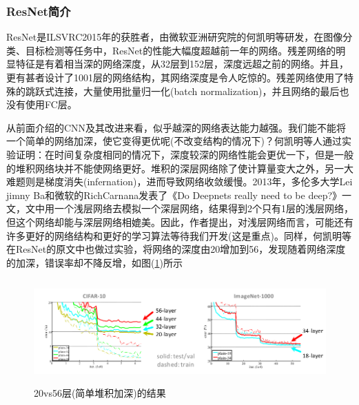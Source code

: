         \subsubsection{ResNet简介}
            \par
            ResNet\cite{2015.HeKaiming}是ILSVRC2015年的获胜者，由微软亚洲研究院的何凯明等研发，在图像分类、目标检测等任务中，ResNet的性能大幅度超越前一年的网络。残差网络的明显特征是有着相当深的网络深度，从32层到152层，深度远超之前的网络。并且，更有甚者设计了1001层的网络结构，其网络深度是令人吃惊的。残差网络使用了特殊的跳跃式连接，大量使用批量归一化(batch normalization)，并且网络的最后也没有使用FC层。
            \par
            从前面介绍的CNN及其改进来看，似乎越深的网络表达能力越强。我们能不能将一个简单的网络加深，使它变得更优呢(不改变结构的情况下)？何凯明等人通过实验证明：在时间复杂度相同的情况下，深度较深的网络性能会更优一下，但是一般的堆积网络块并不能使网络更好。堆积的深层网络除了使计算量变大之外，另一大难题则是梯度消失(infernation)，进而导致网络收敛缓慢。2013年，多伦多大学Lei jimny Ba和微软的RichCarnana发表了《Do Deepnets really need to be deep?》一文，文中用一个浅层网络去模拟一个深层网络，结果得到2个只有1层的浅层网络，但这个网络却能与深层网络相媲美。因此，作者提出，对浅层网络而言，可能还有许多更好的网络结构和更好的学习算法等待我们开发(这是重点)。同样，何凯明等在ResNet的原文\cite{2015.HeKaiming}中也做过实验，将网络的深度由20增加到56，发现随着网络深度的加深，错误率却不降反增，如图(\ref{fig:20vs56层(简单堆积加深)的结果图})所示
            \begin{figure}[H]
              \centering
                \includegraphics[height=4cm]{images/20vs56layer_simple_stack2.jpg}
                \caption{20vs56层(简单堆积加深)的结果}
                \label{fig:20vs56层(简单堆积加深)的结果图}
            \end{figure}


